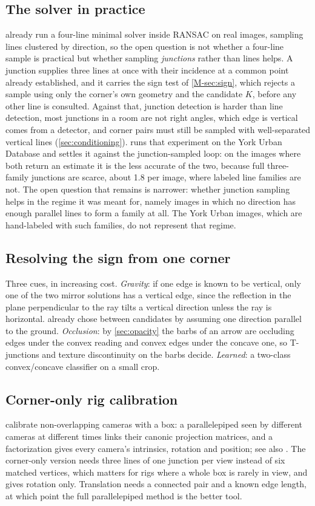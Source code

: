 \subsection{The solver in practice}\label{sec:ransac}
\citet{wildenauer2012} already run a four-line minimal solver inside RANSAC on real images, sampling lines clustered by direction, so the open question is not whether a four-line sample is practical but whether sampling \emph{junctions} rather than lines helps. A junction supplies three lines at once with their incidence at a common point already established, and it carries the sign test of \cref{M-sec:sign}, which rejects a sample using only the corner's own geometry and the candidate $K$, before any other line is consulted. Against that, junction detection is harder than line detection, most junctions in a room are not right angles, which edge is vertical comes from a detector, and corner pairs must still be sampled with well-separated vertical lines (\cref{sec:conditioning}).  runs that experiment on the York Urban Database and settles it against the junction-sampled loop: on the images where both return an estimate it is the less accurate of the two, because full three-family junctions are scarce, about 1.8 per image, where labeled line families are not. The open question that remains is narrower: whether junction sampling helps in the regime it was meant for, namely images in which no direction has enough parallel lines to form a family at all. The York Urban images, which are hand-labeled with such families, do not represent that regime.

\subsection{Resolving the sign from one corner}\label{sec:signcues}
Three cues, in increasing cost. \emph{Gravity}: if one edge is known to be vertical, only one of the two mirror solutions has a vertical edge, since the reflection in the plane perpendicular to the ray tilts a vertical direction unless the ray is horizontal. \citet{shakunaga1989} already chose between candidates by assuming one direction parallel to the ground. \emph{Occlusion}: by \cref{sec:opacity} the barbs of an arrow are occluding edges under the convex reading and convex edges under the concave one, so T-junctions and texture discontinuity on the barbs decide. \emph{Learned}: a two-class convex/concave classifier on a small crop.

\subsection{Corner-only rig calibration}\label{sec:rig}
\citet{wilczkowiak2005} calibrate non-overlapping cameras with a box: a parallelepiped seen by different cameras at different times links their canonic projection matrices, and a factorization gives every camera's intrinsics, rotation and position; see also \citet{esquivel2007}. The corner-only version needs three lines of one junction per view instead of six matched vertices, which matters for rigs where a whole box is rarely in view, and gives rotation only. Translation needs a connected pair and a known edge length, at which point the full parallelepiped method is the better tool.

